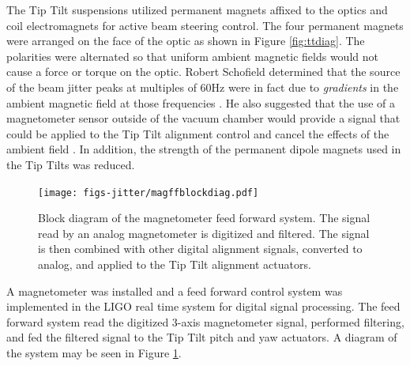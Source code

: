 The Tip Tilt suspensions utilized permanent magnets affixed to the optics and coil electromagnets for active beam steering control. %
The four permanent magnets were arranged on the face of the optic as shown in Figure \ref{fig:ttdiag}. %
The polarities were alternated so that uniform ambient magnetic fields would not cause a force or torque on the optic. %
Robert Schofield determined that the source of the beam jitter peaks at multiples of 60Hz were in fact due to \emph{gradients} in the ambient magnetic field at those frequencies \cite{60Hzgrad}. %
He also suggested that the use of a magnetometer sensor outside of the vacuum chamber would provide a signal that could be applied to the Tip Tilt alignment control and cancel the effects of the ambient field \cite{60hzff}. %
In addition, the strength of the permanent dipole magnets used in the Tip Tilts was reduced.

\begin{figure}
  \begin{center}
  \leavevmode
  \texttt{[image: figs-jitter/magffblockdiag.pdf]}
  \end{center}
  \caption[Block diagram of the magnetometer feed forward system.]{Block diagram of the magnetometer feed forward system. The signal read by an analog magnetometer is digitized and filtered. The signal is then combined with other digital alignment signals, converted to analog, and applied to the Tip Tilt alignment actuators.}
  \label{fig:magffblockdiag}
\end{figure}

A magnetometer was installed and a feed forward control system was implemented in the LIGO real time system for digital signal processing. %
The feed forward system read the digitized 3-axis magnetometer signal, performed filtering, and fed the filtered signal to the Tip Tilt pitch and yaw actuators. %
A diagram of the system may be seen in Figure \ref{fig:magffblockdiag}. %


